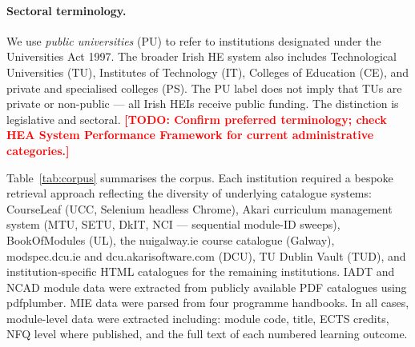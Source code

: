 \documentclass[12pt, a4paper]{article}
\newcommand{\todo}[1]{\textcolor{red}{\textbf{[TODO: #1]}}}
\begin{document}
\paragraph{Sectoral terminology.}
We use \textit{public universities} (PU) to refer to institutions designated under
the Universities Act 1997. The broader Irish HE system also includes Technological
Universities (TU), Institutes of Technology (IT), Colleges of Education (CE), and
private and specialised colleges (PS). The PU label does not imply that TUs are
private or non-public --- all Irish HEIs receive public funding. The distinction is
legislative and sectoral. \todo{Confirm preferred terminology; check HEA System
Performance Framework for current administrative categories.}

Table~\ref{tab:corpus} summarises the corpus. Each institution required a bespoke
retrieval approach reflecting the diversity of underlying catalogue systems:
CourseLeaf (UCC, Selenium headless Chrome), Akari curriculum management system
(MTU, SETU, DkIT, NCI --- sequential module-ID sweeps), BookOfModules (UL),
the nuigalway.ie course catalogue (Galway), modspec.dcu.ie and dcu.akarisoftware.com
(DCU), TU Dublin Vault (TUD), and institution-specific HTML catalogues for the
remaining institutions. IADT and NCAD module data were extracted from publicly
available PDF catalogues using pdfplumber. MIE data were parsed from four programme
handbooks. In all cases, module-level data were extracted including:
module code, title, ECTS credits, NFQ level where published, and the full text
of each numbered learning outcome.
\end{document}
